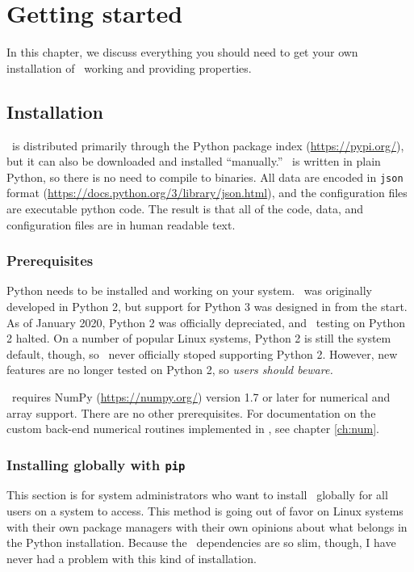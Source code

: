 \chapter{Getting started}\label{ch:start}

In this chapter, we discuss everything you should need to get your own installation of \PM\ working and providing properties.

\section{Installation}

\PM\ is distributed primarily through the Python package index (\url{https://pypi.org/}), but it can also be downloaded and installed ``manually.''  \PM\ is written in plain Python, so there is no need to compile to binaries.  All data are encoded in \texttt{json} format (\url{https://docs.python.org/3/library/json.html}), and the configuration files are executable python code.  The result is that all of the code, data, and configuration files are in human readable text.

\subsection{Prerequisites}

Python needs to be installed and working on your system.  \PM\ was originally developed in Python 2, but support for Python 3 was designed in from the start.  As of January 2020, Python 2 was officially depreciated, and \PM\ testing on Python 2 halted.  On a number of popular Linux systems, Python 2 is still the system default, though, so \PM\ never officially stoped supporting Python 2.  However, new features are no longer tested on Python 2, so \emph{users should beware.}

\PM\ requires NumPy (\url{https://numpy.org/}) version 1.7 or later for numerical and array support.  There are no other prerequisites.  For documentation on the custom back-end numerical routines implemented in \PM, see chapter \ref{ch:num}. 

\subsection{Installing globally with \texttt{pip}}

This section is for system administrators who want to install \PM\ globally for all users on a system to access.  This method is going out of favor on Linux systems with their own package managers with their own opinions about what belongs in the Python installation.  Because the \PM\ dependencies are so slim, though, I have never had a problem with this kind of installation.

